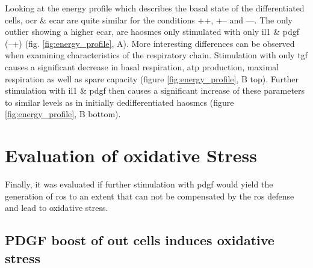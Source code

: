     Looking at the energy profile which describes the basal state of the differentiated cells, \ac{ocr} \& \ac{ecar} are quite similar for the conditions ++, +– and ––. The only outlier showing a higher \ac{ecar}, are \acp{haosmc} only stimulated with only \ac{il1} \& \ac{pdgf} (–+) (fig. \ref{fig:energy_profile}, A). More interesting differences can be observed when examining characteristics of the respiratory chain. Stimulation with only \ac{tgf} causes a significant decrease in basal respiration, \ac{atp} production, maximal respiration as well as spare capacity (figure \ref{fig:energy_profile}, B top). Further stimulation with \ac{il1} \& \ac{pdgf} then causes a significant increase of these parameters to similar levels as in initially dedifferentiated \acp{haosmc} (figure \ref{fig:energy_profile}, B bottom).

\section{Evaluation of oxidative Stress}
\label{sec:oxStress}
Finally, it was evaluated if further stimulation with \ac{pdgf} would yield the generation of \ac{ros} to an extent that can not be compensated by the \ac{ros} defense and lead to oxidative stress.

    \subsection{PDGF boost of out cells induces oxidative stress}

